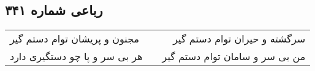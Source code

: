 \begin{center}
\section*{رباعی شماره ۳۴۱}
\label{sec:sh341}
\begin{longtable}{l p{0.5cm} r}
مجنون و پریشان توام دستم گیر
&&
سرگشته و حیران توام دستم گیر
\\
هر بی سر و پا چو دستگیری دارد
&&
من بی سر و سامان توام دستم گیر
\\
\end{longtable}
\end{center}
